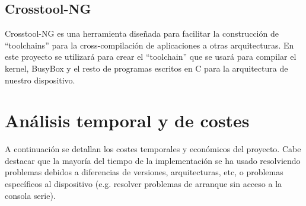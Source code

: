 \documentclass{tfg}
\begin{document}
\subsection{Crosstool-NG}
Crosstool-NG es una herramienta diseñada para facilitar la construcción de ``toolchains'' para la cross-compilación de
aplicaciones a otras arquitecturas. En este proyecto se utilizará para crear el ``toolchain'' que se usará para compilar
el kernel, BusyBox y el resto de programas escritos en C para la arquitectura de nuestro dispositivo. \cite{crosstoolng}

\section{Análisis temporal y de costes}
A continuación se detallan los costes temporales y económicos del proyecto. Cabe destacar que la mayoría del tiempo de la implementación se ha usado resolviendo problemas debidos a diferencias de versiones, arquitecturas, etc, o problemas específicos al dispositivo (e.g. resolver problemas de arranque sin acceso a la consola serie).
\end{document}
